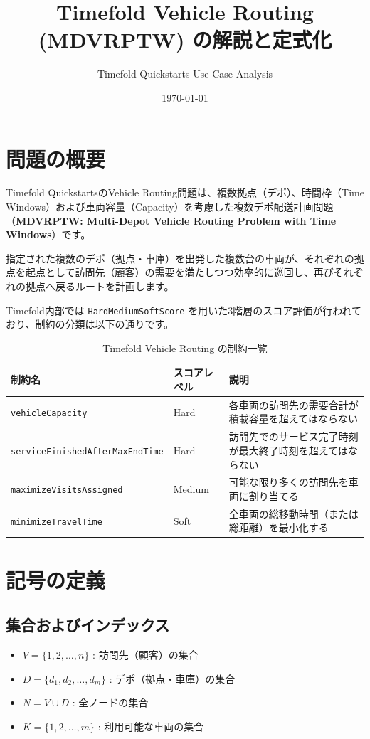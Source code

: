 \documentclass[11pt,a4paper]{article}
\title{Timefold Vehicle Routing (MDVRPTW) の解説と定式化}
\author{Timefold Quickstarts Use-Case Analysis}
\date{\today}
\begin{document}
\maketitle

\section{問題の概要}

Timefold QuickstartsのVehicle Routing問題は、複数拠点（デポ）、時間枠（Time Windows）および車両容量（Capacity）を考慮した複数デポ配送計画問題（\textbf{MDVRPTW: Multi-Depot Vehicle Routing Problem with Time Windows}）です。

指定された複数のデポ（拠点・車庫）を出発した複数台の車両が、それぞれの拠点を起点として訪問先（顧客）の需要を満たしつつ効率的に巡回し、再びそれぞれの拠点へ戻るルートを計画します。

Timefold内部では \texttt{HardMediumSoftScore} を用いた3階層のスコア評価が行われており、制約の分類は以下の通りです。

\begin{table}[htbp]
  \centering
  \caption{Timefold Vehicle Routing の制約一覧}
  \begin{tabular}{lll}
    \toprule
    制約名 & スコアレベル & 説明 \\
    \midrule
    \texttt{vehicleCapacity} & Hard & 各車両の訪問先の需要合計が積載容量を超えてはならない \\
    \texttt{serviceFinishedAfterMaxEndTime} & Hard & 訪問先でのサービス完了時刻が最大終了時刻を超えてはならない \\
    \texttt{maximizeVisitsAssigned} & Medium & 可能な限り多くの訪問先を車両に割り当てる \\
    \texttt{minimizeTravelTime} & Soft & 全車両の総移動時間（または総距離）を最小化する \\
    \bottomrule
  \end{tabular}
\end{table}

\section{記号の定義}

\subsection{集合およびインデックス}
\begin{itemize}
    \item $V = \{1, 2, \dots, n\}$ : 訪問先（顧客）の集合
    \item $D = \{d_1, d_2, \dots, d_m\}$ : デポ（拠点・車庫）の集合
    \item $N = V \cup D$ : 全ノードの集合
    \item $K = \{1, 2, \dots, m\}$ : 利用可能な車両の集合
\end{itemize}
\end{document}
